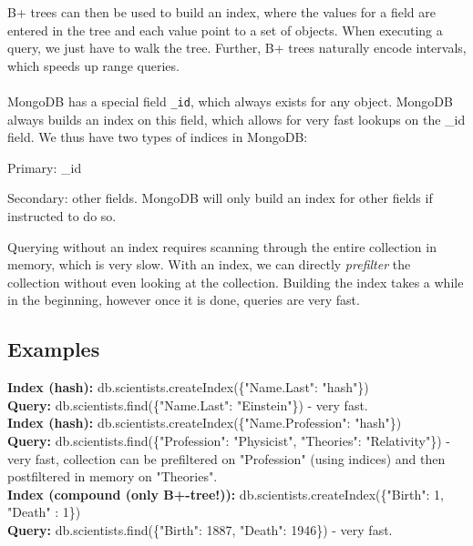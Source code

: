 \documentclass[11pt,oneside,a4paper]{article}
\begin{document}
B+ trees can then be used to build an index, where the values for a field are entered in the tree and each value point to a set of objects. When executing a query, we just have to walk the tree. Further, B+ trees naturally encode intervals, which speeds up range queries.\\\\


MongoDB has a special field \texttt{\_id}, which always exists for any object. MongoDB always builds an index on this field, which allows for very fast lookups on the \_id field. We thus have two types of indices in MongoDB:

\begin{compactitem}
\item Primary: \_id
\item Secondary: other fields. MongoDB will only build an index for other fields if instructed to do so.
\end{compactitem}

Querying without an index requires scanning through the entire collection in memory, which is very slow. With an index, we can directly \textit{prefilter} the collection without even looking at the collection. Building the index takes a while in the beginning, however once it is done, queries are very fast.\\

\subsection{Examples}

\textbf{Index (hash):} db.scientists.createIndex(\{"Name.Last": "hash"\})\\
\textbf{Query:} db.scientists.find(\{"Name.Last": "Einstein"\}) - very fast.\\

\textbf{Index (hash):} db.scientists.createIndex(\{"Name.Profession": "hash"\})\\
\textbf{Query:} db.scientists.find(\{"Profession": "Physicist", "Theories": "Relativity"\}) - very fast, collection can be prefiltered on "Profession" (using indices) and then postfiltered in memory on "Theories".\\

\textbf{Index (compound (only B+-tree!)):} db.scientists.createIndex(\{"Birth": 1, "Death" : 1\})\\
\textbf{Query:} db.scientists.find(\{"Birth": 1887, "Death": 1946\}) - very fast.\\
\end{document}
